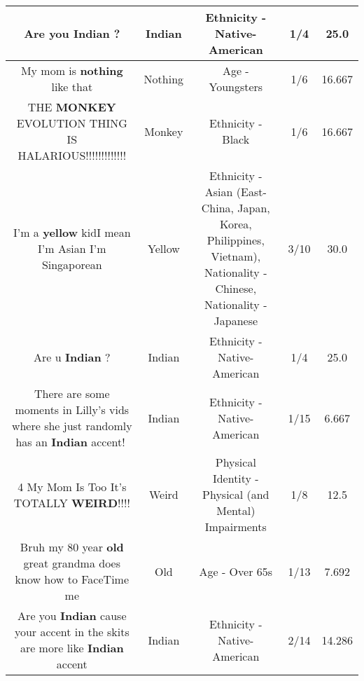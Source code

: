 \documentclass[11pt]{article}
\newlength\mylength
\begin{document}
\begin{center}
\begin{longtable}{|C{.65\mylength}|C{.30\mylength}|C{.12\mylength}|C{.12\mylength}|C{.12\mylength}|}
  \small Are you \textbf{Indian} ?\normalsize   & Indian & Ethnicity - Native-American & 1/4 & 25.0 \\  \hline
  \small My mom is \textbf{nothing} like that\normalsize   & Nothing & Age - Youngsters & 1/6 & 16.667 \\  \hline
  \small THE \textbf{MONKEY} EVOLUTION THING IS HALARIOUS!!!!!!!!!!!!!\normalsize   & Monkey & Ethnicity - Black & 1/6 & 16.667 \\  \hline
  \small I'm a \textbf{y\textbf{e\textbf{llow}}} kidI mean I'm Asian I'm Singaporean\normalsize   & Yellow & Ethnicity - Asian (East- China, Japan, Korea, Philippines, Vietnam), Nationality - Chinese, Nationality - Japanese & 3/10 & 30.0 \\  \hline
  \small Are u \textbf{Indian} ?\normalsize   & Indian & Ethnicity - Native-American & 1/4 & 25.0 \\  \hline
  \small There are some moments in Lilly's vids where she just randomly has an \textbf{Indian} accent!🤣\normalsize   & Indian & Ethnicity - Native-American & 1/15 & 6.667 \\  \hline
  \small 4 My Mom Is Too It's TOTALLY \textbf{WEIRD}!!!!\normalsize   & Weird & Physical Identity - Physical (and Mental) Impairments & 1/8 & 12.5 \\  \hline
  \small Bruh my 80 year \textbf{old} great grandma does know how to FaceTime me\normalsize   & Old & Age - Over 65s & 1/13 & 7.692 \\  \hline
  \small Are you \textbf{Indian} cause your accent in the skits are more like \textbf{Indian} accent\normalsize   & Indian & Ethnicity - Native-American & 2/14 & 14.286 \\  \hline

\end{longtable}
\end{center}
\end{document}
